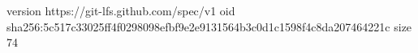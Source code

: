 version https://git-lfs.github.com/spec/v1
oid sha256:5c517c33025ff4f0298098efbf9e2e9131564b3c0d1c1598f4c8da207464221c
size 74
